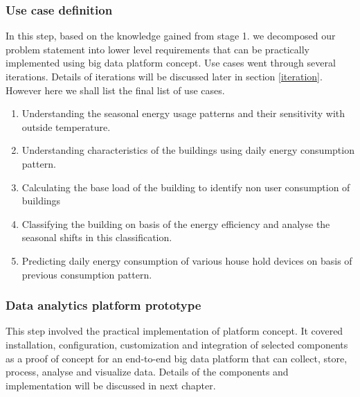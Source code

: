 \subsubsection{Use case definition} \label{usecases}
In this step, based on the knowledge gained from stage 1. we decomposed our problem statement into lower level requirements that can be practically implemented using big data platform concept. Use cases went through several iterations. Details of iterations will be discussed later in section \ref{iteration}. However here we shall list the final list of use cases.
\begin{enumerate}
\item Understanding the seasonal energy usage patterns and their sensitivity with outside temperature.
\item Understanding characteristics of the buildings using daily energy consumption pattern.
\item Calculating the base load of the building to identify non user consumption of buildings
\item Classifying the building on basis of the energy efficiency and analyse the seasonal shifts in this classification.
\item Predicting daily energy consumption of various house hold devices on basis of previous consumption pattern.
\end{enumerate}
\subsubsection{Data analytics platform prototype}
This step involved the practical implementation of platform concept. It covered installation, configuration, customization and integration of selected components as a proof of concept for an end-to-end big data platform that can collect, store, process, analyse and visualize data. Details of the components and implementation will be discussed in next chapter.
